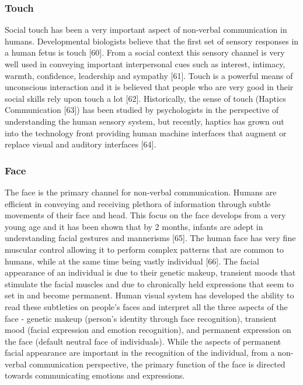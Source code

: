 \documentclass[oneside,11pt]{memoir}
\begin{document}
\subsubsection{Touch}
Social touch has been a very important aspect of non-verbal communication in humans. Developmental biologists believe that the first set of sensory responses in a human fetus is touch [60]. From a social context this sensory channel is very well used in conveying important interpersonal cues such as interest, intimacy, warmth, confidence, leadership and sympathy [61]. Touch is a powerful means of unconscious interaction and it is believed that people who are very good in their social skills rely upon touch a lot [62]. Historically, the sense of touch (Haptics Communication [63]) has been studied by psychologists in the perspective of understanding the human sensory system, but recently, haptics has grown out into the technology front providing human machine interfaces that augment or replace visual and auditory interfaces [64].

\subsubsection{Face}
The face is the primary channel for non-verbal communication. Humans are efficient in conveying and receiving plethora of information through subtle movements of their face and head. This focus on the face develops from a very young age and it has been shown that by 2 months, infants are adept in understanding facial gestures and mannerisms [65]. The human face has very fine muscular control allowing it to perform complex patterns that are common to humans, while at the same time being vastly individual [66]. The facial appearance of an individual is due to their genetic makeup, transient moods that stimulate the facial muscles and due to chronically held expressions that seem to set in and become permanent. Human visual system has developed the ability to read these subtleties on people's faces and interpret all the three aspects of the face - genetic makeup (person's identity through face recognition), transient mood (facial expression and emotion recognition), and permanent expression on the face (default neutral face of individuals). While the aspects of permanent facial appearance are important in the recognition of the individual, from a non-verbal communication perspective, the primary function of the face is directed towards communicating emotions and expressions.
\end{document}
